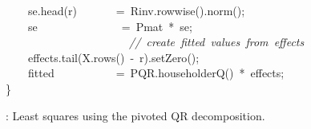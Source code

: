 \documentclass[shortnames,article,nojss]{jss}
\newcommand{\hlstd}[1]{\textcolor[rgb]{0,0,0}{#1}}
\newcommand{\hlopt}[1]{\textcolor[rgb]{0,0,0}{#1}}
\newcommand{\hlslc}[1]{\textcolor[rgb]{0.67,0.13,0.13}{\it{#1}}}
\newcommand{\hlkwd}[1]{\textcolor[rgb]{0,0,0}{#1}}
\begin{document}
\begin{figure}[htb]
    \hlstd{}\hlstd{\ \ \ \ }\hlstd{se}\hlopt{.}\hlstd{}\hlkwd{head}\hlstd{}\hlopt{(}\hlstd{r}\hlopt{)}\hlstd{\ \ \ \ \ \ \ }\hlopt{=\ }\hlstd{Rinv}\hlopt{.}\hlstd{}\hlkwd{rowwise}\hlstd{}\hlopt{().}\hlstd{}\hlkwd{norm}\hlstd{}\hlopt{();}\hspace*{\fill}\\
    \hlstd{}\hlstd{\ \ \ \ }\hlstd{se}\hlstd{\ \ \ \ \ \ \ \ \ \ \ \ \ \ \ }\hlstd{}\hlopt{=\ }\hlstd{Pmat\ }\hlopt{{*}\ }\hlstd{se}\hlopt{;}\hspace*{\fill}\\
    \hlstd{}\hlstd{\ \ \ \ \ \ \ \ \ \ \ \ \ \ \ \ \ \ \ \ \ \ }\hlstd{}\hlslc{//\ create\ fitted\ values\ from\ effects}\hspace*{\fill}\\
    \hlstd{}\hlstd{\ \ \ \ }\hlstd{effects}\hlopt{.}\hlstd{}\hlkwd{tail}\hlstd{}\hlopt{(}\hlstd{X}\hlopt{.}\hlstd{}\hlkwd{rows}\hlstd{}\hlopt{()\ {-}\ }\hlstd{r}\hlopt{).}\hlstd{}\hlkwd{setZero}\hlstd{}\hlopt{();}\hspace*{\fill}\\
    \hlstd{}\hlstd{\ \ \ \ }\hlstd{fitted}\hlstd{\ \ \ \ \ \ \ \ \ \ \ }\hlstd{}\hlopt{=\ }\hlstd{PQR}\hlopt{.}\hlstd{}\hlkwd{householderQ}\hlstd{}\hlopt{()\ {*}\ }\hlstd{effects}\hlopt{;}\hspace*{\fill}\\
    \hlstd{}\hlopt{\}}\hlstd{}\hspace*{\fill}\\
    \mbox{}
    \normalfont
    \normalsize
  \caption{: Least squares using the pivoted QR decomposition.}
  \label{ColPivQRLS}
\end{figure}

\end{document}
